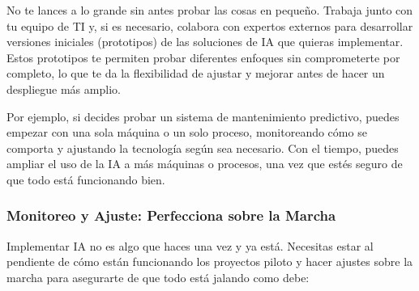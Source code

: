\documentclass[
  letterpaper,
]{book}
\begin{document}
\begin{itemize}
  No te lances a lo grande sin antes probar las cosas en pequeño.
  Trabaja junto con tu equipo de TI y, si es necesario, colabora con
  expertos externos para desarrollar versiones iniciales (prototipos) de
  las soluciones de IA que quieras implementar. Estos prototipos te
  permiten probar diferentes enfoques sin comprometerte por completo, lo
  que te da la flexibilidad de ajustar y mejorar antes de hacer un
  despliegue más amplio.

  Por ejemplo, si decides probar un sistema de mantenimiento predictivo,
  puedes empezar con una sola máquina o un solo proceso, monitoreando
  cómo se comporta y ajustando la tecnología según sea necesario. Con el
  tiempo, puedes ampliar el uso de la IA a más máquinas o procesos, una
  vez que estés seguro de que todo está funcionando bien.
\end{itemize}

\subsubsection{\texorpdfstring{\textbf{Monitoreo y Ajuste: Perfecciona
sobre la
Marcha}}{Monitoreo y Ajuste: Perfecciona sobre la Marcha}}\label{monitoreo-y-ajuste-perfecciona-sobre-la-marcha}

Implementar IA no es algo que haces una vez y ya está. Necesitas estar
al pendiente de cómo están funcionando los proyectos piloto y hacer
ajustes sobre la marcha para asegurarte de que todo está jalando como
debe:
\end{document}
